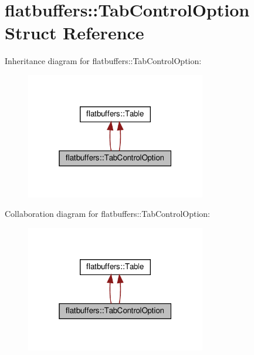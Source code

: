\hypertarget{structflatbuffers_1_1TabControlOption}{}\section{flatbuffers\+:\+:Tab\+Control\+Option Struct Reference}
\label{structflatbuffers_1_1TabControlOption}


Inheritance diagram for flatbuffers\+:\+:Tab\+Control\+Option\+:
\nopagebreak
\begin{figure}[H]
\begin{center}
\leavevmode
\includegraphics[width=223pt]{structflatbuffers_1_1TabControlOption__inherit__graph}
\end{center}
\end{figure}


Collaboration diagram for flatbuffers\+:\+:Tab\+Control\+Option\+:
\nopagebreak
\begin{figure}[H]
\begin{center}
\leavevmode
\includegraphics[width=223pt]{structflatbuffers_1_1TabControlOption__coll__graph}
\end{center}
\end{figure}
